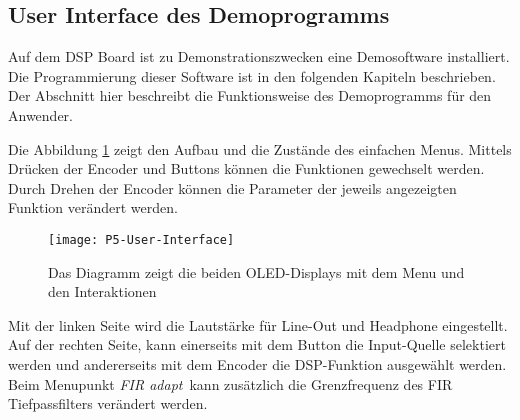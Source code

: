\subsection{User Interface des Demoprogramms}
\label{sec:GUI-Manual}

Auf dem DSP Board ist zu Demonstrationszwecken eine Demosoftware installiert.
Die Programmierung dieser Software ist in den folgenden Kapiteln beschrieben.
Der Abschnitt hier beschreibt die Funktionsweise des Demoprogramms für den Anwender.

Die Abbildung \ref{pic:P5-User-Interface} zeigt den Aufbau und die Zustände des einfachen Menus. Mittels Drücken der Encoder und Buttons können die Funktionen gewechselt werden.
Durch Drehen der Encoder können die Parameter der jeweils angezeigten Funktion verändert werden.

\begin{figure}[H]
	\centering
	\texttt{[image: P5-User-Interface]}
	\caption{Das Diagramm zeigt die beiden OLED-Displays mit dem Menu und den Interaktionen}
	\label{pic:P5-User-Interface}
\end{figure}

Mit der linken Seite wird die Lautstärke für Line-Out und Headphone eingestellt.
Auf der rechten Seite, kann einerseits mit dem Button die Input-Quelle selektiert werden und andererseits mit dem Encoder die DSP-Funktion ausgewählt werden. 
Beim Menupunkt \glqq\textit{FIR adapt}\grqq \ kann zusätzlich die Grenzfrequenz des FIR Tiefpassfilters verändert werden.



